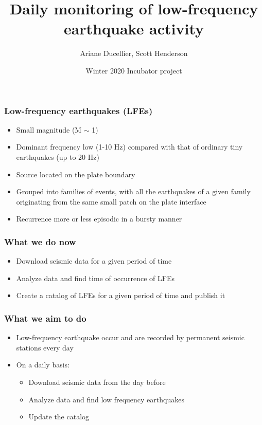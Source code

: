 \documentclass{beamer}
\title[Daily monitoring of low-frequency earthquake activity]{Daily monitoring of low-frequency earthquake activity}
\author{Ariane Ducellier, Scott Henderson}
\date{Winter 2020 Incubator project}
\begin{document}
	\begin{frame}
		\titlepage
	\end{frame}

	\begin{frame}
		\frametitle{Low-frequency earthquakes (LFEs)}
		\begin{itemize}
			\item Small magnitude (M $\sim$ 1)
			\item Dominant frequency low (1-10 Hz) compared with that of ordinary tiny earthquakes (up to 20 Hz)
			\item Source located on the plate boundary
			\item Grouped into families of events, with all the earthquakes of a given family originating from the same small patch on the plate interface
			\item Recurrence more or less episodic in a bursty manner
		\end{itemize}
	\end{frame}

	\begin{frame}
		\frametitle{What we do now}
		\begin{itemize}
			\item Download seismic data for a given period of time
			\item Analyze data and find time of occurrence of LFEs
			\item Create a catalog of LFEs for a given period of time and publish it
		\end{itemize}
	\end{frame}

	\begin{frame}
		\frametitle{What we aim to do}
		\begin{itemize}
			\item Low-frequency earthquake occur and are recorded by permanent seismic stations every day
			\item On a daily basis:
			\begin{itemize}
				\item Download seismic data from the day before
				\item Analyze data and find low frequency earthquakes
				\item Update the catalog
			\end{itemize}
		\end{itemize}
	\end{frame}
\end{document}
